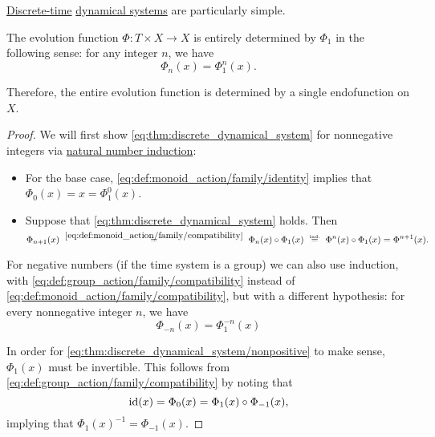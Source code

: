 \begin{proposition}\label{thm:discrete_dynamical_system}
  \hyperref[def:dynamical_system_time_classification]{Discrete-time} \hyperref[def:dynamical_system]{dynamical systems} are particularly simple.

  The evolution function \( \Phi: T \times X \to X \) is entirely determined by \( \Phi_1 \) in the following sense: for any integer \( n \), we have
  \begin{equation}\label{eq:thm:discrete_dynamical_system}
    \Phi_n(x) = \Phi_1^n(x).
  \end{equation}

  Therefore, the entire evolution function is determined by a single endofunction on \( X \).
\end{proposition}
\begin{proof}
  We will first show \eqref{eq:thm:discrete_dynamical_system} for nonnegative integers via \hyperref[con:induction/peano_arithmetic]{natural number induction}:
  \begin{itemize}
    \item For the base case, \eqref{eq:def:monoid_action/family/identity} implies that \( \Phi_0(x) = x = \Phi_1^0(x) \).

    \item Suppose that \eqref{eq:thm:discrete_dynamical_system} holds. Then
    \begin{equation*}
      \Phi_{n + 1}(x)
      \reloset {\eqref{eq:def:monoid_action/family/compatibility}} =
      \Phi_n(x) \bincirc \Phi_1(x)
      \reloset {\T{ind.}} =
      \Phi^n(x) \bincirc \Phi_1(x)
      =
      \Phi^{n+1}(x).
    \end{equation*}
  \end{itemize}

  For negative numbers (if the time system is a group) we can also use induction, with \eqref{eq:def:group_action/family/compatibility} instead of \eqref{eq:def:monoid_action/family/compatibility}, but with a different hypothesis: for every nonnegative integer \( n \), we have
  \begin{equation}\label{eq:thm:discrete_dynamical_system/nonpositive}
    \Phi_{-n}(x) = \Phi_1^{-n}(x)
  \end{equation}

  In order for \eqref{eq:thm:discrete_dynamical_system/nonpositive} to make sense, \( \Phi_1(x) \) must be invertible. This follows from \eqref{eq:def:group_action/family/compatibility} by noting that
  \begin{equation*}
    \id(x) = \Phi_0(x) = \Phi_1(x) \bincirc \Phi_{-1}(x),
  \end{equation*}
  implying that \( \Phi_1(x)^{-1} = \Phi_{-1}(x) \).
\end{proof}

